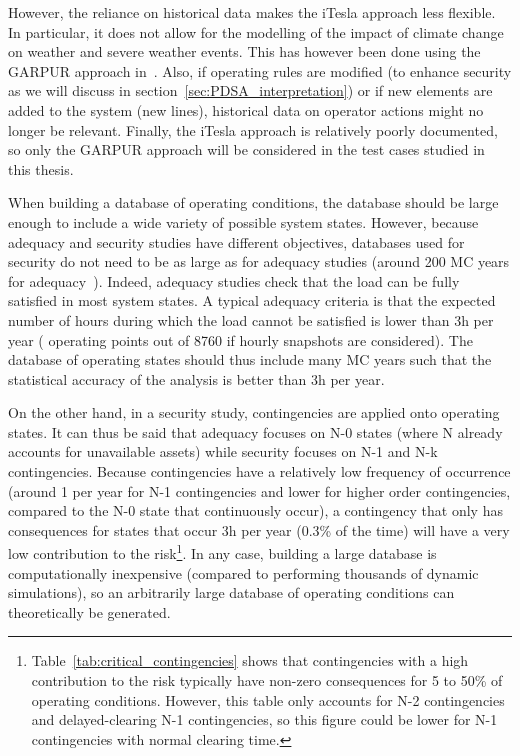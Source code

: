 However, the reliance on historical data makes the iTesla approach less flexible. In particular, it does not allow for the modelling of the impact of climate change on weather and severe weather events. This has however been done using the GARPUR approach in~\cite{ENTSOE_MC_year}. Also, if operating rules are modified (\eg to enhance security as we will discuss in section~\ref{sec:PDSA_interpretation}) or if new elements are added to the system (\eg new lines), historical data on operator actions might no longer be relevant. Finally, the iTesla approach is relatively poorly documented, so only the GARPUR approach will be considered in the test cases studied in this thesis.

When building a database of operating conditions, the database should be large enough to include a wide variety of possible system states. However, because adequacy and security studies have different objectives, databases used for security do not need to be as large as for adequacy studies (around 200 MC years for adequacy~\cite{EliaAdequacy}). Indeed, adequacy studies check that the load can be fully satisfied in most system states. A typical adequacy criteria is that the expected number of hours during which the load cannot be satisfied is lower than 3h per year ( operating points out of 8760 if hourly snapshots are considered). The database of operating states should thus include many MC years such that the statistical accuracy of the analysis is better than 3h per year.

On the other hand, in a security study, contingencies are applied onto operating states. It can thus be said that adequacy focuses on N-0 states (where N already accounts for unavailable assets) while security focuses on N-1 and N-k contingencies. Because contingencies have a relatively low frequency of occurrence (around 1 per year for N-1 contingencies and lower for higher order contingencies, compared to the N-0 state that continuously occur), a contingency that only has consequences for states that occur 3h per year (0.3\% of the time) will have a very low contribution to the risk\footnote{Table~\ref{tab:critical_contingencies} shows that contingencies with a high contribution to the risk typically have non-zero consequences for 5 to 50\% of operating conditions. However, this table only accounts for N-2 contingencies and delayed-clearing N-1 contingencies, so this figure could be lower for N-1 contingencies with normal clearing time.}. In any case, building a large database is computationally inexpensive (compared to performing thousands of dynamic simulations), so an arbitrarily large database of operating conditions can theoretically be generated.


